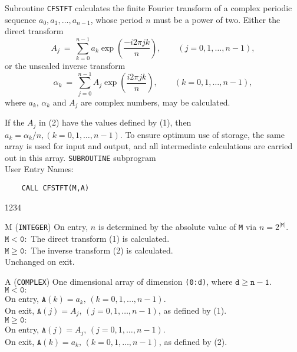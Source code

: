                                  
  
\Submitter{}                                    
Subroutine {\tt CFSTFT} calculates the finite Fourier transform of a
complex periodic sequence $a_0,a_1,\ldots,a_{n-1}$,
whose period $n$ must be a power of two. Either the direct transform
\begin{equation}
A_j \ = \ \sum_{k=0}^{n-1} a_k \exp \left( \frac{-i 2\pi jk}{n} \right),
\qquad (j=0,1,\ldots,n-1),
\end{equation}
or the unscaled inverse transform
\begin{equation}
\alpha_k \ = \
\sum_{j=0}^{n-1} A_j \exp \left( \frac{i 2\pi jk}{n} \right),
\qquad (k=0,1,\ldots,n-1),
\end{equation}
where $a_k,\,\alpha_k$ and $A_j$ are complex numbers, may be calculated.
\par
If the $A_j$ in (2) have the values defined by (1), then
$a_k=\alpha_k/n, (k=0,1,\ldots,n-1)$.
To ensure optimum use of storage, the same array is used for input and
output, and all intermediate calculations are carried out in this array.
\Structure
{\tt SUBROUTINE} subprogram \\
User Entry Names: 
\Usage
\begin{verbatim}
    CALL CFSTFT(M,A)
\end{verbatim}
\begin{DLtt}{1234}
\item[M] ({\tt INTEGER}) On entry, $n$ is determined by the absolute
value of {\tt M} via $n=2^{\mathtt{|M|}}$. \\
$\mathtt{M<0:}$ The direct transform (1) is calculated. \\
$\mathtt{M \ge 0:}$ The inverse transform (2) is calculated. \\
Unchanged on exit.
\item[A] ({\tt COMPLEX}) One dimensional array of dimension {\tt (0:d)},
where $\mathtt{d \ge n-1}$. \\
$\mathtt{M<0:}$ \\
On entry, $\mathtt{A}(k)=a_k,\,(k=0,1,\ldots,n-1)$.\\
On exit, $\mathtt{A}(j)=A_j,\,(j=0,1,\ldots,n-1)$,
as defined by (1). \\
$\mathtt{M \ge 0:}$ \\
On entry, $\mathtt{A}(j)=A_j,\,(j=0,1,\ldots,n-1)$. \\
On exit, $\mathtt{A}(k)=a_k,\,(k=0,1,\ldots,n-1)$,
as defined by (2).
\end{DLtt}
